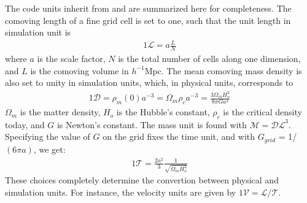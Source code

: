 \documentclass[useAMS,usenatbib]{mn2e}
\begin{document}
The code units inherit from \citep{2004NewA....9..443T} and are summarized here for completeness.
The comoving length of a fine grid cell is set to one,
such that the unit length in simulation unit is 
\begin{eqnarray}
1\mathcal{L} = a \frac{L}{N} 
\end{eqnarray}
where $a$ is the scale factor, $N$ is the total number of cells along one dimension,
and $L$ is the comoving volume in $h^{-1}\mbox{Mpc}$.
The mean comoving mass density is also set to unity in simulation units, 
which, in physical units, corresponds to 
\begin{eqnarray}
1\mathcal{D} = \rho_{m}(0) a^{-3} = \Omega_{m} \rho_{c} a^{-3} = \frac{3 \Omega_{m} H_{o}^{2}}{8 \pi G a^{3} }
\end{eqnarray}
$\Omega_{m}$ is the matter density, $H_{o}$ is the Hubble's constant, $\rho_{c}$ is the critical density today,
and $G$ is Newton's constant. The mass unit is found with $\mathcal{M} = \mathcal{DL}^{3}$.
Specifying the value of $G$ on the grid fixes the time unit, and with $G_{grid}$ = 1/$(6 \pi a)$,
we get:
\begin{eqnarray}
1 \mathcal{T} = \frac{2a^{2}}{3}\frac{1}{\sqrt{\Omega_{m}H_{o}^{2}}}
\end{eqnarray}
These choices completely determine the convertion between physical and simulation units.
For instance, the velocity units are given by $1\mathcal{V} = \mathcal{L}$/$\mathcal{T}$.
\end{document}
